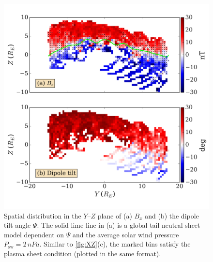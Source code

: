 \documentclass[draft]{agujournal2019}
\begin{document}
\begin{figure}
\centering
\noindent\includegraphics[width=\textwidth]{Fig7_YZ_distribution.pdf}
\caption{
Spatial distribution in the $Y$--$Z$ plane of (a) $B_x$ and (b) the dipole tilt angle $\Psi$. The solid lime line in (a) is a global tail neutral sheet model \cite{Xiao2016} dependent on $\Psi$ and the average solar wind pressure $P_\text{sw}=2\,\si{nPa}$. Similar to \cref{fig:XZ}(c), the marked bins satisfy the plasma sheet condition  (plotted in the same format).
}
\label{fig:YZ}
\end{figure}
\end{document}
